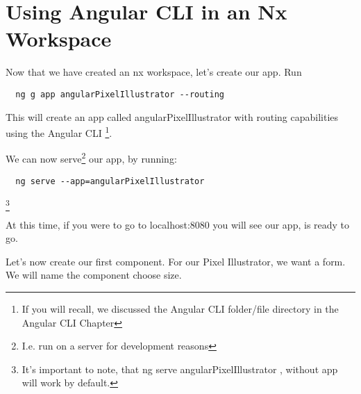 \maketitle{}
\section{ Using Angular CLI in an Nx Workspace }

Now that we have created an nx workspace, let's create our app. Run
\begin{verbatim}
  ng g app angularPixelIllustrator --routing
\end{verbatim}

This will create an app called angularPixelIllustrator with routing capabilities
using the Angular CLI \footnote{If you will recall, we discussed the Angular
CLI folder/file directory in the Angular CLI Chapter}.

We can now serve\footnote{I.e. run on a server for development reasons} our app,
by running:
\begin{verbatim}
  ng serve --app=angularPixelIllustrator
\end{verbatim} \footnote{It's important to note, that ng serve angularPixelIllustrator
, without app will work by default. }

At this time, if you were to go to localhost:8080 you will see our app, is
ready to go.

Let's now create our first component. For our Pixel Illustrator, we want a form.
We will name the component choose size.

